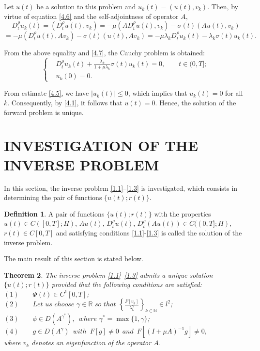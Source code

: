 \documentclass[reqno]{amsart}
\newtheorem{thm}{Theorem}[section]
\theoremstyle{definition}
\newtheorem{defn}[thm]{Definition}
\numberwithin{equation}{section}
\begin{document}
Let $u(t)$ be a solution to this problem and $u_k(t)=(u(t),v_k)$. Then, by virtue of equation \eqref{4.6} and the self-adjointness of operator $A$,
$$
D_{t}^{\rho }{{u}_{k}}(t)=(D_{t}^{\rho }u(t),{{v}_{k}})=-\mu (AD_{t}^{\rho }u(t),{{v}_{k}})-\sigma(t)(Au(t),{{v}_{k}})
$$
$$
=-\mu (D_{t}^{\rho }u(t),A{{v}_{k}})-\sigma(t)(u(t),A{{v}_{k}})=-\mu {{\lambda }_{k}}D_{t}^{\rho }{{u}_{k}}(t)-{{\lambda }_{k}}\sigma(t){{u}_{k}}(t).
$$

From the above equality and \eqref{4.7}, the Cauchy problem is obtained:
\begin{equation}\label{4.8}
\left\{
\begin{aligned}
    & D_{t}^{\rho }{{u}_{k}}(t)+\frac{{{\lambda }_{k}}}{1+ \mu{{\lambda }_{k}}}\sigma (t){{u}_{k}}(t)=0, \qquad t \in (0,T]; \\
    & u_{k}(0) = 0.
\end{aligned} \right.
\end{equation}

From estimate \eqref{4.5}, we have $\left| u_{k}(t) \right| \le 0$, which implies that $u_{k}(t)=0$ for all $k$. Consequently, by \eqref{4.1}, it follows that $u(t)=0$. Hence, the solution of the forward problem is unique.

\section{INVESTIGATION OF THE INVERSE PROBLEM} In this section, the inverse problem \eqref{1.1}–\eqref{1.3} is investigated, which consists in determining the pair of functions $\{u(t); r(t)\}$.

\begin{defn}\label{def5.1} A pair of functions $\{u(t);r(t)\}$ with the properties  $u(t)\in C([0,T];H)$,  $Au(t)$, $D_t^{\rho}u(t)$, $D_t^{\rho}(Au(t)) \in C((0,T];H)$, $r(t) \in C[0,T]$ and satisfying conditions \eqref{1.1}-\eqref{1.3} is called the solution of the inverse problem.  
\end{defn}

The main result of this section is stated below.

\begin{thm} \label{thm5.2} The inverse problem \eqref{1.1}–\eqref{1.3} admits a unique solution $\{u(t); r(t)\}$ provided that the following conditions are satisfied:\\
$(1) \qquad \Phi(t) \in C^{1}[0,T]$;\\
$(2) \qquad  Let\,\, us \,\, choose \,\, \gamma \in \mathbb{R} \,\, so \,\, that  \,\, \left\{\frac{F\left[v_k\right]}{\lambda_k^\gamma}\right\}_{k \in \mathbb{N}} \in l^2 $;\\
$(3) \qquad \phi \in D(A^{\gamma^*}), \,\,\, where \,\, \gamma^* = \max \{1, \gamma\}$;\\
$(4) \qquad g \in D(A^\gamma) \,\,\, with \,\,\, F[g] \ne 0 \,\,\, and \,\,\, F[{{(I+\mu A)}^{-1}}g] \ne 0, $\\
where $v_k$ denotes an eigenfunction of the operator $A$.
\end{thm}
\end{document}
